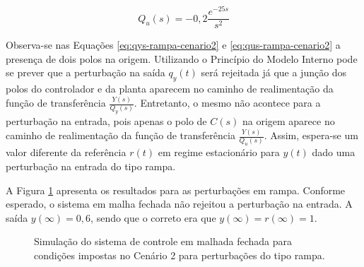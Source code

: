 \begin{equation}
    \label{eq:qus-rampa-cenario2}
    Q_{u}(s) = -0,2\frac{e^{-25s}}{s^{2}}
\end{equation}

Observa-se nas Equações \ref{eq:qys-rampa-cenario2} e
\ref{eq:qus-rampa-cenario2} a presença de dois polos na origem. Utilizando o
Princípio do Modelo Interno pode se prever que a perturbação na saída $q_{y}(t)$
será rejeitada já que a junção dos polos do controlador e da planta aparecem no
caminho de realimentação da função de transferência $\frac{Y(s)}{Q_{y}(s)}$.
Entretanto, o mesmo não acontece para a perturbação na entrada, pois apenas o
polo de $C(s)$ na origem aparece no caminho de realimentação da função de
transferência $\frac{Y(s)}{Q_{u}(s)}$. Assim, espera-se um valor diferente da
referência $r(t)$ em regime estacionário para $y(t)$ dado uma perturbação na
entrada do tipo rampa.

A Figura \ref{fig:resultado-desafio1-cenario2-b} apresenta os resultados para as
perturbações em rampa. Conforme esperado, o sistema em malha fechada não
rejeitou a perturbação na entrada. A saída $y(\infty) = 0,6$, sendo que o correto
era que $y(\infty) = r(\infty) = 1$.

\begin{figure}[!ht]
    \caption{Simulação do sistema de controle em malhada fechada para condições
    impostas no Cenário 2 para perturbações do tipo rampa.}
    \vspace{-10pt}
    \hspace{-30pt}
    \label{fig:resultado-desafio1-cenario2-b}
    \begin{minipage}{\linewidth}
        
    \end{minipage}
\end{figure}